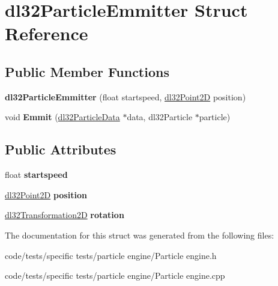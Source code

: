 \hypertarget{structdl32_particle_emmitter}{\section{dl32\-Particle\-Emmitter Struct Reference}
\label{structdl32_particle_emmitter}
}
\subsection*{Public Member Functions}
\begin{DoxyCompactItemize}
\item 
\hypertarget{structdl32_particle_emmitter_a8568ba1a79a2805d878b9aa3fbaa0cb7}{{\bfseries dl32\-Particle\-Emmitter} (float startspeed, \hyperlink{structdl32_point2_d}{dl32\-Point2\-D} position)}\label{structdl32_particle_emmitter_a8568ba1a79a2805d878b9aa3fbaa0cb7}

\item 
\hypertarget{structdl32_particle_emmitter_aa3b465e2c8921b7bcdefaeb48fd0e426}{void {\bfseries Emmit} (\hyperlink{structdl32_particle_data}{dl32\-Particle\-Data} $\ast$data, dl32\-Particle $\ast$particle)}\label{structdl32_particle_emmitter_aa3b465e2c8921b7bcdefaeb48fd0e426}

\end{DoxyCompactItemize}
\subsection*{Public Attributes}
\begin{DoxyCompactItemize}
\item 
\hypertarget{structdl32_particle_emmitter_abffe9b9c088e2bc3a1e8b57cabcfa69f}{float {\bfseries startspeed}}\label{structdl32_particle_emmitter_abffe9b9c088e2bc3a1e8b57cabcfa69f}

\item 
\hypertarget{structdl32_particle_emmitter_ac85c45d604146dce14ca0c293ce440e6}{\hyperlink{structdl32_point2_d}{dl32\-Point2\-D} {\bfseries position}}\label{structdl32_particle_emmitter_ac85c45d604146dce14ca0c293ce440e6}

\item 
\hypertarget{structdl32_particle_emmitter_ae20109588faf8f3f52325cfd0f77321d}{\hyperlink{classdl32_transformation2_d}{dl32\-Transformation2\-D} {\bfseries rotation}}\label{structdl32_particle_emmitter_ae20109588faf8f3f52325cfd0f77321d}

\end{DoxyCompactItemize}


The documentation for this struct was generated from the following files\-:\begin{DoxyCompactItemize}
\item 
code/tests/specific tests/particle engine/Particle engine.\-h\item 
code/tests/specific tests/particle engine/Particle engine.\-cpp\end{DoxyCompactItemize}
